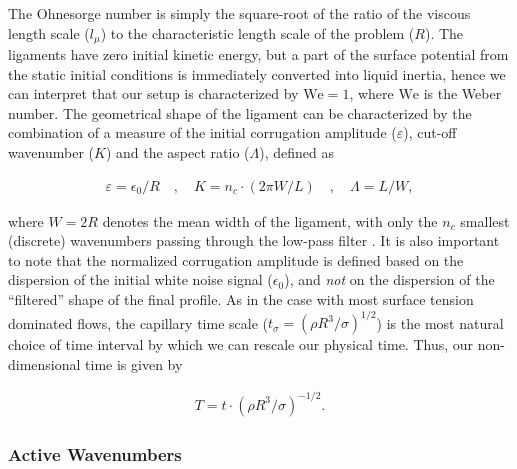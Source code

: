 The Ohnesorge number is simply the square-root of the ratio  
of the viscous length scale ($l_\mu$)  
to the characteristic length scale of the problem ($R$).
The ligaments have zero initial kinetic energy, 
but a part of the surface potential from the static initial conditions 
is immediately converted into liquid inertia, 
hence we can interpret that our setup is characterized 
by $\textrm{We} = 1$, where $\textrm{We}$ is the Weber number.
The geometrical shape of the ligament can 
be characterized by the combination of a measure of the initial
corrugation amplitude ($\varepsilon$),
cut-off wavenumber ($K$) and the aspect ratio ($\Lambda$), defined as   

\begin{align}
 \varepsilon = \epsilon_0 / R \quad , \quad K = n_c \cdot \left(2\pi W/ L \right) \quad
	, \quad \Lambda = L / W , 
\end{align}

where $W = 2R$ denotes the mean width of the ligament, with only
the $n_c$ smallest (discrete) wavenumbers passing through the low-pass filter .
It is also important to note that the normalized corrugation amplitude 
is defined based on the dispersion of the initial white noise signal ($\epsilon_0$),
and \textit{not} on the dispersion of the ``filtered'' shape of the final profile. 
As in the case with most surface tension dominated flows, 
the capillary time scale ($t_\sigma = (\rho R^3 / \sigma)^{1/2}$) is the most 
natural choice of time interval by which we can rescale our physical time.
Thus, our non-dimensional time is given by 

\begin{align}
	T = t \cdot \left(\rho R^3 / \sigma \right)^{-1/2} . 
\end{align}


\subsubsection*{Active Wavenumbers}

